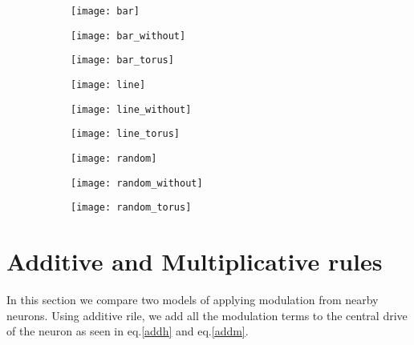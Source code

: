 \begin{figure}[H]
\caption{}
\begin{subfigure}{.33\textwidth}
  \centering
  \texttt{[image: bar]}
\end{subfigure}%
\hfill
\begin{subfigure}{.33\textwidth}
  \centering
  \texttt{[image: bar\_without]}
\end{subfigure}
\hfill
\begin{subfigure}{.33\textwidth}
  \centering
  \texttt{[image: bar\_torus]}
\end{subfigure}%
\hfill
\begin{subfigure}{.33\textwidth}
  \centering
  \texttt{[image: line]}
\end{subfigure}
\hfill
\begin{subfigure}{.33\textwidth}
  \centering
  \texttt{[image: line\_without]}
\end{subfigure}%
\hfill
\begin{subfigure}{.33\textwidth}
  \centering
  \texttt{[image: line\_torus]}
\end{subfigure}
\hfill
\begin{subfigure}{.33\textwidth}
  \centering
  \texttt{[image: random]}
\end{subfigure}%
\hfill
\begin{subfigure}{.33\textwidth}
  \centering
  \texttt{[image: random\_without]}
\end{subfigure}%
\hfill
\begin{subfigure}{.33\textwidth}
  \centering
  \texttt{[image: random\_torus]}
\end{subfigure}
\end{figure}



\section{Additive and Multiplicative rules} \label{addvsmultmodel}

In this section we compare two models of applying modulation from nearby neurons. Using additive rile, we add all the modulation terms to the central drive of the neuron as seen in eq.\ref{addh} and eq.\ref{addm}. 

